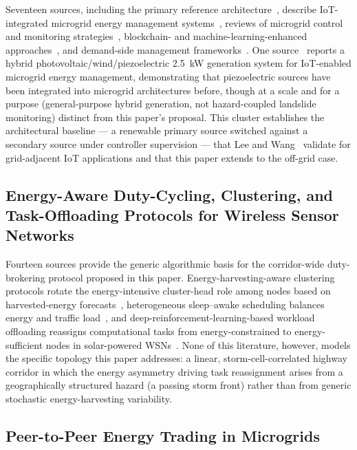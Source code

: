 \documentclass[electronics,article,submit,moreauthors]{Definitions/mdpi}
\begin{document}
Seventeen sources, including the primary reference architecture~\cite{ref101}, describe IoT-integrated microgrid energy management systems~\cite{ref96,ref97,ref98,ref99,ref100}, reviews of microgrid control and monitoring strategies~\cite{ref102,ref108,ref111}, blockchain- and machine-learning-enhanced approaches~\cite{ref95,ref103,ref105}, and demand-side management frameworks~\cite{ref109,ref112}. One source~\cite{ref104} reports a hybrid photovoltaic/wind/piezoelectric 2.5~kW generation system for IoT-enabled microgrid energy management, demonstrating that piezoelectric sources have been integrated into microgrid architectures before, though at a scale and for a purpose (general-purpose hybrid generation, not hazard-coupled landslide monitoring) distinct from this paper's proposal. This cluster establishes the architectural baseline --- a renewable primary source switched against a secondary source under controller supervision --- that Lee and Wang~\cite{ref101} validate for grid-adjacent IoT applications and that this paper extends to the off-grid case.

\subsection{Energy-Aware Duty-Cycling, Clustering, and Task-Offloading Protocols for Wireless Sensor Networks}

Fourteen sources provide the generic algorithmic basis for the corridor-wide duty-brokering protocol proposed in this paper. Energy-harvesting-aware clustering protocols rotate the energy-intensive cluster-head role among nodes based on harvested-energy forecasts~\cite{ref113,ref115,ref122}, heterogeneous sleep--awake scheduling balances energy and traffic load~\cite{ref114,ref118}, and deep-reinforcement-learning-based workload offloading reassigns computational tasks from energy-constrained to energy-sufficient nodes in solar-powered WSNs~\cite{ref121}. None of this literature, however, models the specific topology this paper addresses: a linear, storm-cell-correlated highway corridor in which the energy asymmetry driving task reassignment arises from a geographically structured hazard (a passing storm front) rather than from generic stochastic energy-harvesting variability.

\subsection{Peer-to-Peer Energy Trading in Microgrids}
\end{document}
